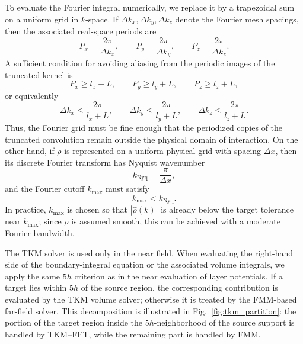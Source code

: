 \documentclass[preprint,12pt]{elsarticle}
\newcommand{\V}[1]{\boldsymbol{#1}}
\begin{document}
To evaluate the Fourier integral numerically, we replace it by a trapezoidal sum on a uniform grid in \(k\)-space. 
If \(\Delta k_x,\Delta k_y,\Delta k_z\) denote the Fourier mesh spacings, then the associated real-space periods are
\begin{equation}
    P_x=\frac{2\pi}{\Delta k_x},\qquad
    P_y=\frac{2\pi}{\Delta k_y},\qquad
    P_z=\frac{2\pi}{\Delta k_z}.
\end{equation}
A sufficient condition for avoiding aliasing from the periodic images of the truncated kernel is
\begin{equation}
    P_x \ge l_x + L,\qquad
    P_y \ge l_y + L,\qquad
    P_z \ge l_z + L,
\end{equation}
or equivalently
\begin{equation}
    \Delta k_x \le \frac{2\pi}{l_x+L},\qquad
    \Delta k_y \le \frac{2\pi}{l_y+L},\qquad
    \Delta k_z \le \frac{2\pi}{l_z+L}.
\end{equation}
Thus, the Fourier grid must be fine enough that the periodized copies of the truncated convolution remain outside the physical domain of interaction. 
On the other hand, if \(\rho\) is represented on a uniform physical grid with spacing \(\Delta x\), then its discrete Fourier transform has Nyquist wavenumber
\begin{equation}
    k_{\mathrm{Nyq}}=\frac{\pi}{\Delta x},
\end{equation}
and the Fourier cutoff \(k_{\max}\) must satisfy
\begin{equation}
    k_{\max}<k_{\mathrm{Nyq}}.
\end{equation}
In practice, \(k_{\max}\) is chosen so that \(|\widehat{\rho}(k)|\) is already below the target tolerance near \(k_{\max}\); since \(\rho\) is assumed smooth, this can be achieved with a moderate Fourier bandwidth. 

The TKM solver is used only in the near field. 
When evaluating the right-hand side of the boundary-integral equation or the associated volume integrals, we apply the same \(5h\) criterion as in the near evaluation of layer potentials. 
If a target lies within \(5h\) of the source region, the corresponding contribution is evaluated by the TKM volume solver; otherwise it is treated by the FMM-based far-field solver. 
This decomposition is illustrated in Fig.~\ref{fig:tkm_partition}: the portion of the target region inside the \(5h\)-neighborhood of the source support is handled by TKM--FFT, while the remaining part is handled by FMM.
\end{document}
